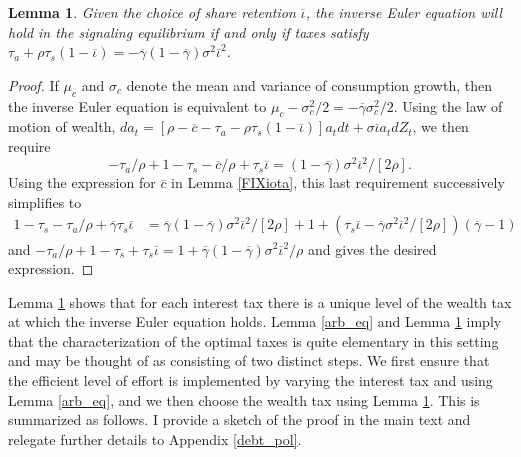 \documentclass[11pt]{article}
\theoremstyle{plain}
\newtheorem{lemma}[thm]{Lemma}
\begin{document}
\begin{lemma} \label{IEsig}
Given the choice of share retention $\overline{\iota}$, the inverse Euler equation will hold in the signaling equilibrium if and only if taxes satisfy $\tau_a + \rho\tau_s(1 - \overline{\iota}) = -\overline{\gamma}(1-\overline{\gamma}) \sigma^2 \overline{\iota}^2$.
\end{lemma} 

\begin{proof}
If $\mu_c$ and $\sigma_c$ denote the mean and variance of consumption growth, then the inverse Euler equation is equivalent to $\mu_c - \sigma_c^2/2 = -\overline{\gamma}\sigma_c^2/2$. Using the law of motion of wealth, $da_t  = {\left[\rho - \overline{c} - \tau_a - \rho\tau_s(1 - \overline{\iota})\right]}a_tdt + \sigma \overline{\iota}a_t dZ_t$, we then require
$$
-\tau_a/\rho + 1 - \tau_s - \overline{c}/\rho + \tau_s\overline{\iota} = (1 - \overline{\gamma}) \sigma^2 \overline{\iota}^2/[2\rho].
$$
Using the expression for $\overline{c}$ in Lemma \ref{FIXiota}, this last requirement successively simplifies to
\begin{align*}
1 - \tau_s - \tau_a/\rho + \overline{\gamma}\tau_s\overline{\iota} & = \overline{\gamma}(1-\overline{\gamma}) \sigma^2 \overline{\iota}^2/[2\rho] + 1 + {\left(\tau_s\overline{\iota} - \overline{\gamma}\sigma^2\overline{\iota}^2/[2\rho]\right)}(\overline{\gamma}-1)
\end{align*}
and $-\tau_a/\rho + 1-\tau_s + \tau_s\overline{\iota} = 1 + \overline{\gamma}(1-\overline{\gamma})\sigma^2 \overline{\iota}^2/\rho$ and gives the desired expression. 
\end{proof}

Lemma \ref{IEsig} shows that for each interest tax there is a unique level of the wealth tax at which the inverse Euler equation holds. Lemma \ref{arb_eq} and Lemma \ref{IEsig} imply that the characterization of the optimal taxes is quite elementary in this setting and may be thought of as consisting of two distinct steps. We first ensure that the efficient level of effort is implemented by varying the interest tax and using Lemma \ref{arb_eq}, and we then choose the wealth tax using Lemma \ref{IEsig}. This is summarized as follows. I provide a sketch of the proof in the main text and relegate further details to Appendix \ref{debt_pol}. 
\end{document}
